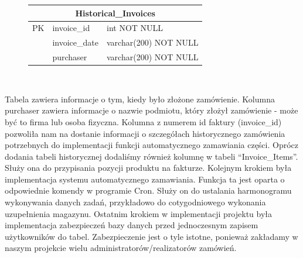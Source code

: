 \documentclass{article}
\begin{document}
\begin{figure}[H]
   \centering
   \begin{tabular}{|c|l|l|} \hline
      \multicolumn{3}{|c|}{Historical\_Invoices} \\ \hline
      PK & invoice\_id   & int NOT NULL          \\ \hline
         & invoice\_date & varchar(200) NOT NULL \\
         & purchaser     & varchar(200) NOT NULL \\ \hline
   \end{tabular} \\
\end{figure}
\vspace{0.3cm}
Tabela zawiera informacje o tym, kiedy było złożone zamówienie.
Kolumna purchaser zawiera informacje o nazwie podmiotu, który złożył zamówienie
- może być to firma lub osoba fizyczna. Kolumna z numerem id faktury (invoice\_id) pozwoliła nam na
dostanie informacji o szczegółach historycznego zamówienia potrzebnych do implementacji funkcji
automatycznego zamawiania części. Oprócz dodania tabeli
historycznej dodaliśmy również kolumnę w tabeli ``Invoice\_Items''. Służy ona do przypisania pozycji
produktu na fakturze. Kolejnym krokiem była implementacja systemu automatycznego zamawiania. Funkcja ta jest oparta o odpowiednie komendy
w programie Cron. Służy on do ustalania harmonogramu wykonywania danych zadań, przykładowo do
cotygodniowego wykonania uzupełnienia magazynu. Ostatnim krokiem w implementacji projektu była
implementacja zabezpieczeń bazy danych przed jednoczesnym zapisem użytkowników do tabel.
Zabezpieczenie jest o tyle istotne, ponieważ zakładamy w naszym projekcie wielu administratorów/realizatorów zamówień.
\end{document}
